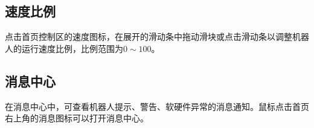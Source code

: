 
\subsection{速度比例}
点击\LM 首页控制区的速度图标，在展开的滑动条中拖动滑块或点击滑动条以调整机器人的运行速度比例，比例范围为$0\sim 100$。

\subsection{消息中心}
在消息中心中，可查看机器人提示、警告、软硬件异常的消息通知。鼠标点击\LM 首页右上角的消息图标\colorbox{black}{}可以打开消息中心。

